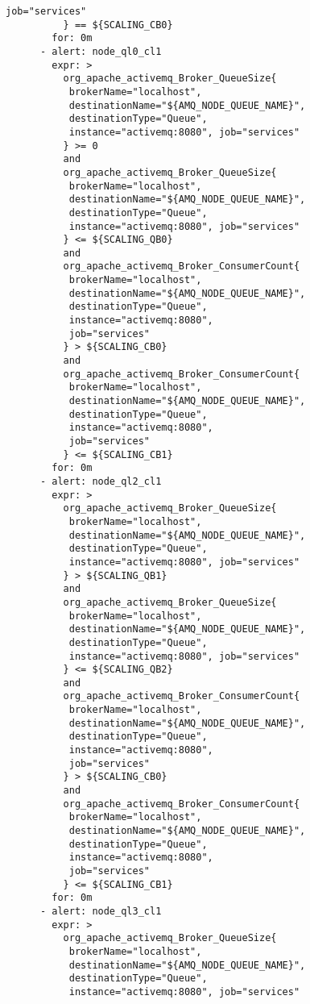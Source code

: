 \begin{lstlisting}[style=bashStyle,caption={alert-unparsed.yml},label=lst:alert-unparsed]
           job="services"
          } == ${SCALING_CB0}
        for: 0m
      - alert: node_ql0_cl1
        expr: >
          org_apache_activemq_Broker_QueueSize{
           brokerName="localhost", 
           destinationName="${AMQ_NODE_QUEUE_NAME}",
           destinationType="Queue", 
           instance="activemq:8080", job="services"
          } >= 0
          and 
          org_apache_activemq_Broker_QueueSize{
           brokerName="localhost", 
           destinationName="${AMQ_NODE_QUEUE_NAME}",
           destinationType="Queue", 
           instance="activemq:8080", job="services"
          } <= ${SCALING_QB0}
          and 
          org_apache_activemq_Broker_ConsumerCount{
           brokerName="localhost",
           destinationName="${AMQ_NODE_QUEUE_NAME}", 
           destinationType="Queue",
           instance="activemq:8080", 
           job="services"
          } > ${SCALING_CB0}
          and
          org_apache_activemq_Broker_ConsumerCount{
           brokerName="localhost",
           destinationName="${AMQ_NODE_QUEUE_NAME}", 
           destinationType="Queue",
           instance="activemq:8080", 
           job="services"
          } <= ${SCALING_CB1}
        for: 0m
      - alert: node_ql2_cl1
        expr: >
          org_apache_activemq_Broker_QueueSize{
           brokerName="localhost", 
           destinationName="${AMQ_NODE_QUEUE_NAME}",
           destinationType="Queue", 
           instance="activemq:8080", job="services"
          } > ${SCALING_QB1}
          and 
          org_apache_activemq_Broker_QueueSize{
           brokerName="localhost", 
           destinationName="${AMQ_NODE_QUEUE_NAME}",
           destinationType="Queue", 
           instance="activemq:8080", job="services"
          } <= ${SCALING_QB2}
          and 
          org_apache_activemq_Broker_ConsumerCount{
           brokerName="localhost",
           destinationName="${AMQ_NODE_QUEUE_NAME}", 
           destinationType="Queue",
           instance="activemq:8080", 
           job="services"
          } > ${SCALING_CB0}
          and
          org_apache_activemq_Broker_ConsumerCount{
           brokerName="localhost",
           destinationName="${AMQ_NODE_QUEUE_NAME}", 
           destinationType="Queue",
           instance="activemq:8080", 
           job="services"
          } <= ${SCALING_CB1}
        for: 0m
      - alert: node_ql3_cl1
        expr: >
          org_apache_activemq_Broker_QueueSize{
           brokerName="localhost", 
           destinationName="${AMQ_NODE_QUEUE_NAME}",
           destinationType="Queue", 
           instance="activemq:8080", job="services"

\end{lstlisting}
